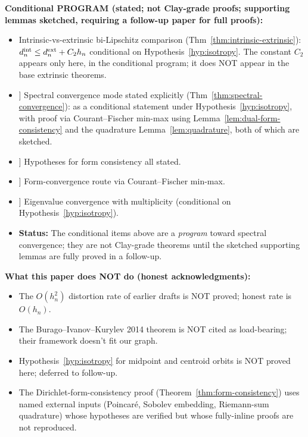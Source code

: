 \documentclass[11pt, a4paper]{amsart}
\theoremstyle{definition}
\begin{document}
\textbf{Conditional PROGRAM (stated; not Clay-grade proofs; supporting
lemmas sketched, requiring a follow-up paper for full proofs):}
\begin{itemize}
\item Intrinsic-vs-extrinsic bi-Lipschitz comparison
  (Thm~\ref{thm:intrinsic-extrinsic}): $d_n^{\rm int} \leq
  d_n^{\rm ext} + C_2 h_n$ conditional on
  Hypothesis~\ref{hyp:isotropy}. The constant $C_2$ appears
  only here, in the conditional program; it does NOT appear in
  the base extrinsic theorems.
\item[[13]] Spectral convergence mode stated explicitly
  (Thm~\ref{thm:spectral-convergence}): as a conditional
  statement under Hypothesis~\ref{hyp:isotropy}, with proof via
  Courant--Fischer min-max using
  Lemma~\ref{lem:dual-form-consistency} and the quadrature
  Lemma~\ref{lem:quadrature}, both of which are sketched.
\item[[14]] Hypotheses for form consistency all stated.
\item[[16]] Form-convergence route via Courant--Fischer min-max.
\item[[21]] Eigenvalue convergence with multiplicity (conditional
  on Hypothesis~\ref{hyp:isotropy}).
\item \textbf{Status:} The conditional items above are a
  \emph{program} toward spectral convergence; they are not
  Clay-grade theorems until the sketched supporting lemmas are
  fully proved in a follow-up.
\end{itemize}

\textbf{What this paper does NOT do (honest acknowledgments):}
\begin{itemize}
\item The $O(h_n^2)$ distortion rate of earlier drafts is
  NOT proved; honest rate is $O(h_n)$.
\item The Burago--Ivanov--Kurylev 2014 theorem is NOT cited
  as load-bearing; their framework doesn't fit our graph.
\item Hypothesis~\ref{hyp:isotropy} for midpoint and centroid
  orbits is NOT proved here; deferred to follow-up.
\item The Dirichlet-form-consistency proof
  (Theorem~\ref{thm:form-consistency}) uses named external
  inputs (Poincar\'e, Sobolev embedding, Riemann-sum quadrature)
  whose hypotheses are verified but whose fully-inline proofs
  are not reproduced.
\end{itemize}

\end{document}

